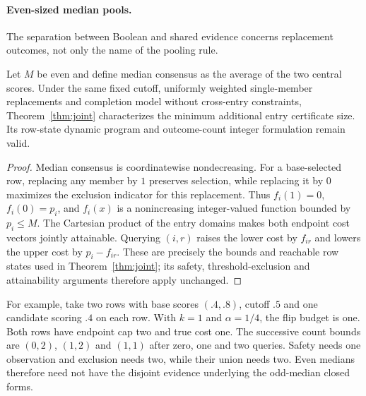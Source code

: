 \paragraph{Even-sized median pools.}
\label{app:even-median}
The separation between Boolean and shared evidence concerns replacement outcomes, not only the name of the pooling rule.
\begin{corollary}
\label{cor:even-median}
Let $M$ be even and define median consensus as the average of the two central scores. Under the same fixed cutoff, uniformly weighted single-member replacements and completion model without cross-entry constraints, Theorem~\ref{thm:joint} characterizes the minimum additional entry certificate size. Its row-state dynamic program and outcome-count integer formulation remain valid.
\end{corollary}
\begin{proof}
Median consensus is coordinatewise nondecreasing. For a base-selected row, replacing any member by $1$ preserves selection, while replacing it by $0$ maximizes the exclusion indicator for this replacement. Thus $f_i(1)=0$, $f_i(0)=p_i$, and $f_i(x)$ is a nonincreasing integer-valued function bounded by $p_i\le M$. The Cartesian product of the entry domains makes both endpoint cost vectors jointly attainable. Querying $(i,r)$ raises the lower cost by $f_{ir}$ and lowers the upper cost by $p_i-f_{ir}$. These are precisely the bounds and reachable row states used in Theorem~\ref{thm:joint}; its safety, threshold-exclusion and attainability arguments therefore apply unchanged.
\end{proof}
For example, take two rows with base scores $(.4,.8)$, cutoff $.5$ and one candidate scoring $.4$ on each row. With $k=1$ and $\alpha=1/4$, the flip budget is one. Both rows have endpoint cap two and true cost one. The successive count bounds are $(0,2)$, $(1,2)$ and $(1,1)$ after zero, one and two queries. Safety needs one observation and exclusion needs two, while their union needs two. Even medians therefore need not have the disjoint evidence underlying the odd-median closed forms.

